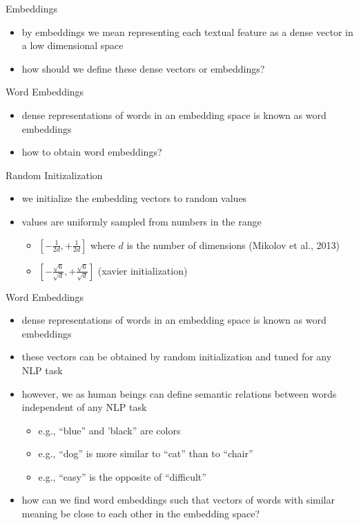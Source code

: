 \begin{frame}{Embeddings}
    \begin{itemize}
        \item<1-> by embeddings we mean representing each textual feature as a dense vector in a low dimensional space
        \item<2-> how should we define these dense vectors or embeddings?
    \end{itemize}
\end{frame}
\begin{frame}{Word Embeddings}
    \begin{itemize}
        \item dense representations of words in an embedding space is known as word embeddings
        \item how to obtain word embeddings?  
    \end{itemize}
\end{frame}
\begin{frame}{Random Initizalization}
    \begin{itemize}
        \item<1-> we initialize the embedding vectors to random values
        \item<2-> values are uniformly sampled from numbers in the range
        \begin{itemize}
            \item<3->  $[-\frac{1}{2d}, +\frac{1}{2d} ] $ where $d$ is the number of dimensions (Mikolov et al., 2013)
            \item<4->  $[-\frac{\sqrt{6}}{\sqrt{d}}, +\frac{\sqrt{6}}{\sqrt{d}} ] $ (xavier initialization)
        \end{itemize}
    \end{itemize}
\end{frame}
\begin{frame}{Word Embeddings}
    \begin{itemize}
        \item<1-> dense representations of words in an embedding space is known as word embeddings
        \item<2-> these vectors can be obtained by random initialization and tuned for any NLP task
        \item<3-> however, we as human beings can define semantic relations between words independent of any NLP task
        \begin{itemize}
        \item e.g., ``blue'' and  'black'' are colors
        \item e.g., ``dog'' is more similar to ``cat'' than to ``chair'' 
        \item e.g., ``easy'' is the opposite of ``difficult''
        \end{itemize}
        \item<4-> how can we find word embeddings such that vectors of words with similar meaning be close to each other in the embedding space?
    \end{itemize}
\end{frame}
